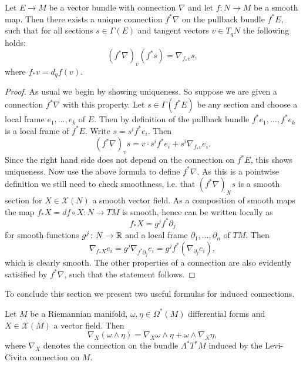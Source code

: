 \begin{proposition}
    \label{riem_mnf:prop:pullback_connections}
    Let $E \to M$ be a vector bundle with connection $\nabla$ and let $f \colon N \to M$ be a smooth map. Then there exists a unique connection $f^\ast \nabla$ on the pullback bundle $f^\ast E$, such that for all sections $s \in \Gamma(E)$ and tangent vectors $v \in T_qN$ the following holds:
    \[
    (f^\ast \nabla)_v (f^\ast s) = \nabla_{f_\ast v} s,
    \]
    where $f_\ast v = d_qf(v)$.
\end{proposition}
\begin{proof}
    As usual we begin by showing uniqueness. So suppose we are given a connection $f^\ast \nabla$ with this property. Let $s \in \Gamma(f^\ast E)$ be any section and choose a local frame $e_1,\ldots,e_k$ of $E$. Then by definition of the pullback bundle $f^\ast e_1,\ldots, f^\ast e_k$ is a local frame of $f^\ast E$. Write $s = s^i f^\ast e_i$. Then
    \[
    (f^\ast \nabla)_v s = v \cdot s^i f^\ast e_i + s^i \nabla_{f_\ast v} e_i.
    \]
    Since the right hand side does not depend on the connection on $f^\ast E$, this shows uniqueness. Now use the above formula to define $f^\ast \nabla$. As this is a pointwise definition we still need to check smoothness, i.e. that $(f^\ast \nabla)_X s$ is a smooth section for $X \in \mathscr{X}(N)$ a smooth vector field. As a composition of smooth maps the map $f_\ast X = df \circ X \colon N \to TM$ is smooth, hence can be written locally as 
    \[
    f_\ast X = g^j f^\ast \partial_j 
    \]
    for smooth functions $g^j \colon N \to \mathbb{R}$ and a local frame $\partial_1,\ldots,\partial_n$ of $TM$. Then 
    \[
    \nabla_{f_\ast X} e_i = g^j \nabla_{f^\ast \partial_j} e_i = g^j f^\ast(\nabla_{\partial_j} e_i),
    \]
    which is clearly smooth. The other properties of a connection are also evidently satisified by $f^\ast \nabla$, such that the statement follows.
\end{proof}

To conclude this section we present two useful formulas for induced connections.

\begin{lemma}
    Let $M$ be a Riemannian manifold, $\omega,\eta \in \Omega^\ast(M)$ differential forms and $X \in \mathscr{X}(M)$ a vector field. Then 
    \[
    \nabla_X(\omega \wedge \eta) = \nabla_X \omega \wedge \eta + \omega \wedge \nabla_X\eta,
    \]
    where $\nabla_X$ denotes the connection on the bundle $\Lambda^\ast T^\ast M$ induced by the Levi-Civita connection on $M$.
\end{lemma}

